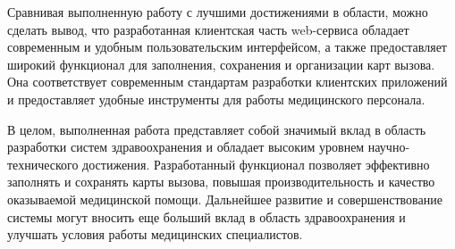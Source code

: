 Сравнивая выполненную работу с лучшими достижениями в области, можно сделать вывод, что разработанная клиентская часть web-сервиса обладает современным и удобным пользовательским интерфейсом, а также предоставляет широкий функционал для заполнения, сохранения и организации карт вызова. Она соответствует современным стандартам разработки клиентских приложений и предоставляет удобные инструменты для работы медицинского персонала.

В целом, выполненная работа представляет собой значимый вклад в область разработки систем здравоохранения и обладает высоким уровнем научно-технического достижения. Разработанный функционал позволяет эффективно заполнять и сохранять карты вызова, повышая производительность и качество оказываемой медицинской помощи. Дальнейшее развитие и совершенствование системы могут вносить еще больший вклад в область здравоохранения и улучшать условия работы медицинских специалистов.
